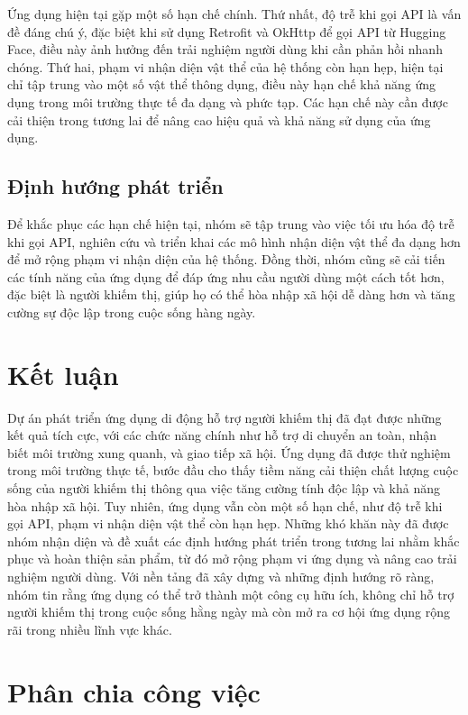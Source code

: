 \documentclass[a4paper,12pt]{article}
\begin{document}
Ứng dụng hiện tại gặp một số hạn chế chính. Thứ nhất, độ trễ khi gọi API là vấn đề đáng chú ý, đặc biệt khi sử dụng Retrofit và OkHttp để gọi API từ Hugging Face, điều này ảnh hưởng đến trải nghiệm người dùng khi cần phản hồi nhanh chóng. Thứ hai, phạm vi nhận diện vật thể của hệ thống còn hạn hẹp, hiện tại chỉ tập trung vào một số vật thể thông dụng, điều này hạn chế khả năng ứng dụng trong môi trường thực tế đa dạng và phức tạp. Các hạn chế này cần được cải thiện trong tương lai để nâng cao hiệu quả và khả năng sử dụng của ứng dụng.

\subsection{Định hướng phát triển}

Để khắc phục các hạn chế hiện tại, nhóm sẽ tập trung vào việc tối ưu hóa độ trễ khi gọi API, nghiên cứu và triển khai các mô hình nhận diện vật thể đa dạng hơn để mở rộng phạm vi nhận diện của hệ thống. Đồng thời, nhóm cũng sẽ cải tiến các tính năng của ứng dụng để đáp ứng nhu cầu người dùng một cách tốt hơn, đặc biệt là người khiếm thị, giúp họ có thể hòa nhập xã hội dễ dàng hơn và tăng cường sự độc lập trong cuộc sống hàng ngày.

\section{Kết luận}

Dự án phát triển ứng dụng di động hỗ trợ người khiếm thị đã đạt được những kết quả tích cực, với các chức năng chính như hỗ trợ di chuyển an toàn, nhận biết môi trường xung quanh, và giao tiếp xã hội. Ứng dụng đã được thử nghiệm trong môi trường thực tế, bước đầu cho thấy tiềm năng cải thiện chất lượng cuộc sống của người khiếm thị thông qua việc tăng cường tính độc lập và khả năng hòa nhập xã hội. Tuy nhiên, ứng dụng vẫn còn một số hạn chế, như độ trễ khi gọi API, phạm vi nhận diện vật thể còn hạn hẹp. Những khó khăn này đã được nhóm nhận diện và đề xuất các định hướng phát triển trong tương lai nhằm khắc phục và hoàn thiện sản phẩm, từ đó mở rộng phạm vi ứng dụng và nâng cao trải nghiệm người dùng. Với nền tảng đã xây dựng và những định hướng rõ ràng, nhóm tin rằng ứng dụng có thể trở thành một công cụ hữu ích, không chỉ hỗ trợ người khiếm thị trong cuộc sống hằng ngày mà còn mở ra cơ hội ứng dụng rộng rãi trong nhiều lĩnh vực khác.

\section{Phân chia công việc}
\end{document}
